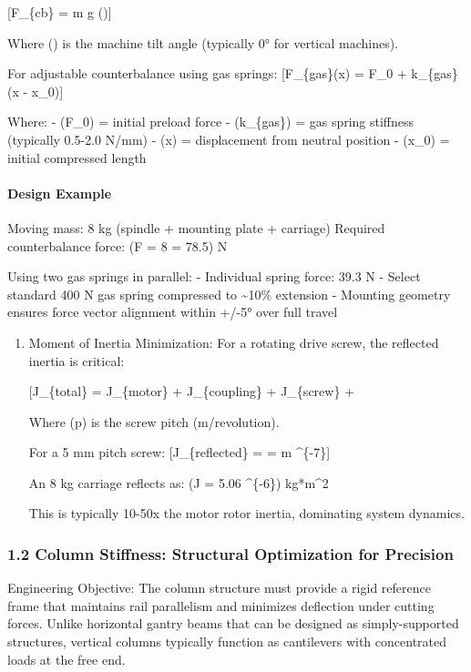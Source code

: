 \documentclass[
]{article}
\begin{document}
{[}F\_\{cb\} = m g \cos(\theta){]}

Where (\theta) is the machine tilt angle (typically 0° for vertical
machines).

For adjustable counterbalance using gas springs: {[}F\_\{gas\}(x) = F\_0
+ k\_\{gas\}(x - x\_0){]}

Where: - (F\_0) = initial preload force - (k\_\{gas\}) = gas spring
stiffness (typically 0.5-2.0 N/mm) - (x) = displacement from neutral
position - (x\_0) = initial compressed length

\paragraph{Design Example}\label{design-example}

Moving mass: 8 kg (spindle + mounting plate + carriage) Required
counterbalance force: (F = 8  = 78.5) N

Using two gas springs in parallel: - Individual spring force: 39.3 N -
Select standard 400 N gas spring compressed to \textasciitilde10\%
extension - Mounting geometry ensures force vector alignment within
+/-5° over full travel

\begin{enumerate}
\def\labelenumi{\arabic{enumi}.}
\setcounter{enumi}{3}
\item
  Moment of Inertia Minimization: For a rotating drive screw, the
  reflected inertia is critical:

  {[}J\_\{total\} = J\_\{motor\} + J\_\{coupling\} + J\_\{screw\} +
  \frac{m_{carriage}}{(2\pi/p)^2}{]}

  Where (p) is the screw pitch (m/revolution).

  For a 5 mm pitch screw: {[}J\_\{reflected\} = 
  = m  \^{}\{-7\}{]}

  An 8 kg carriage reflects as: (J = 5.06 \^{}\{-6\}) kg*m\^{}2

  This is typically 10-50x the motor rotor inertia, dominating system
  dynamics.
\end{enumerate}

\subsubsection{1.2 Column Stiffness: Structural Optimization for
Precision}\label{column-stiffness-structural-optimization-for-precision}

Engineering Objective: The column structure must provide a rigid
reference frame that maintains rail parallelism and minimizes deflection
under cutting forces. Unlike horizontal gantry beams that can be
designed as simply-supported structures, vertical columns typically
function as cantilevers with concentrated loads at the free end.
\end{document}
